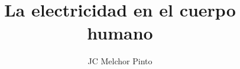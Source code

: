 \documentclass[12pt,addpoints,answers]{guia}
\title{La electricidad en el cuerpo humano}
\author{JC Melchor Pinto}
\begin{document}
\INFO%
\begin{questions}
    \questionboxed[25]{}
    \questionboxed[25]{}
    \questionboxed[25]{}
\end{questions}
\end{document}
